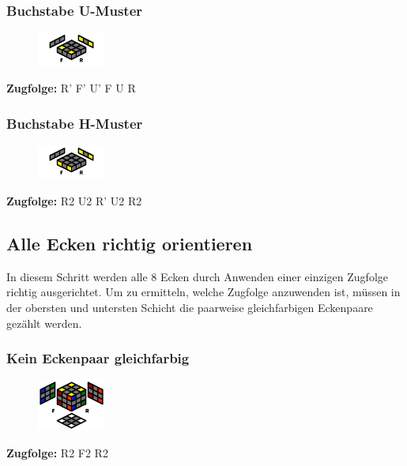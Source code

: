 \documentclass[letterpaper,10pt,twoside,twocolumn,openany]{book}
\begin{document}
\subsubsection{Buchstabe U-Muster}
\begin{figure}[!htb] 
  \centering
     \includegraphics[width=0.20\textwidth]{img/u_pattern.png}
\end{figure}

\centering \textbf{Zugfolge:} R' F' U' F U R

\subsubsection{Buchstabe H-Muster}
\begin{figure}[!htb] 
  \centering
     \includegraphics[width=0.20\textwidth]{img/h_pattern.png}
\end{figure}
\centering \textbf{Zugfolge:} R2 U2 R' U2 R2

\subsection{Alle Ecken richtig \newline orientieren}
\begin{justify}
In diesem Schritt werden alle 8 Ecken durch Anwenden einer einzigen Zugfolge richtig ausgerichtet. Um zu ermitteln, welche Zugfolge anzuwenden ist, müssen in der obersten und untersten Schicht die paarweise gleichfarbigen Eckenpaare gezählt werden. 
\end{justify}

\newpage
\subsubsection{Kein Eckenpaar gleichfarbig}
\begin{figure}[!htb] 
  \centering
     \includegraphics[width=0.20\textwidth]{img/orient-0-solved.png}
\end{figure}
\centering \textbf{Zugfolge:} R2 F2 R2
        
\end{document}
